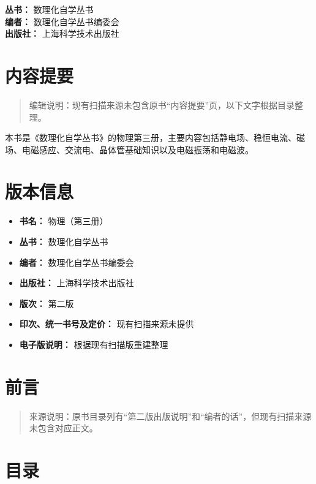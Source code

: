 \textbf{丛书：} 数理化自学丛书\\
\textbf{编者：} 数理化自学丛书编委会\\
\textbf{出版社：} 上海科学技术出版社

\chapter{内容提要}\label{ux5185ux5bb9ux63d0ux8981}

\begin{quote}
编辑说明：现有扫描来源未包含原书``内容提要''页，以下文字根据目录整理。
\end{quote}

本书是《数理化自学丛书》的物理第三册，主要内容包括静电场、稳恒电流、磁场、电磁感应、交流电、晶体管基础知识以及电磁振荡和电磁波。

\chapter{版本信息}\label{ux7248ux672cux4fe1ux606f}

\begin{itemize}
\tightlist
\item
  \textbf{书名：} 物理（第三册）
\item
  \textbf{丛书：} 数理化自学丛书
\item
  \textbf{编者：} 数理化自学丛书编委会
\item
  \textbf{出版社：} 上海科学技术出版社
\item
  \textbf{版次：} 第二版
\item
  \textbf{印次、统一书号及定价：} 现有扫描来源未提供
\item
  \textbf{电子版说明：} 根据现有扫描版重建整理
\end{itemize}

\chapter{前言}\label{ux524dux8a00}

\begin{quote}
来源说明：原书目录列有``第二版出版说明''和``编者的话''，但现有扫描来源未包含对应正文。
\end{quote}

\chapter{目录}\label{ux76eeux5f55}

